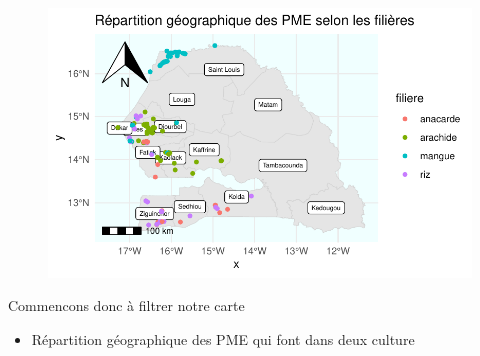 \documentclass[
  letterpaper,
  DIV=11,
  numbers=noendperiod]{scrartcl}
\providecommand{\tightlist}{%
  \setlength{\itemsep}{0pt}\setlength{\parskip}{0pt}}\usepackage{longtable,booktabs,array}
\begin{document}
\begin{figure}[H]

{\centering \includegraphics{projet_R_files/figure-pdf/unnamed-chunk-42-1.pdf}

}

\end{figure}

Commencons donc à filtrer notre carte\\

\begin{itemize}
\tightlist
\item
  Répartition géographique des PME qui font dans deux culture\\
\end{itemize}
\end{document}
